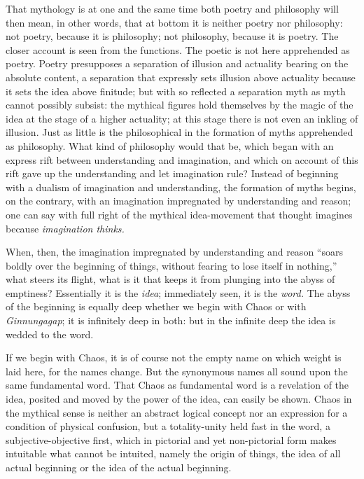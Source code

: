 \documentclass[12pt,a4paper,openany]{book}
\newcommand{\opage}[1]{\marginnote{\footnotesize\textit{[#1]}}}
\begin{document}
That mythology is at one and the same time both poetry and philosophy will then mean, in other words, that at bottom
it is neither poetry nor philosophy: not poetry, because it is philosophy; not philosophy, because it is poetry. The
closer account is seen from the functions. The poetic is not here apprehended as poetry. Poetry presupposes a
separation of illusion and actuality bearing on the absolute content, a separation that expressly sets illusion above
actuality because it sets the idea above finitude; but with so reflected a separation myth as myth cannot possibly
subsist: the mythical figures hold themselves by the magic of the idea at the stage of a higher actuality; at this
stage there is not even an inkling of illusion. Just as little is the philosophical in the formation of myths
apprehended as philosophy. What kind of philosophy would that be, which began with an express rift between
understanding and imagination, and which on account of this rift gave up the understanding and let imagination
\opage{83}rule? Instead of beginning with a dualism of imagination and understanding, the formation of myths begins,
on the contrary, with an imagination impregnated by understanding and reason; one can say with full right of the
mythical idea-movement that thought imagines because \emph{imagination thinks.}

When, then, the imagination impregnated by understanding and reason ``soars boldly over the beginning of things,
without fearing to lose itself in nothing,'' what steers its flight, what is it that keeps it from plunging into the
abyss of emptiness? Essentially it is the \emph{idea}; immediately seen, it is the \emph{word.} The abyss of the
beginning is equally deep whether we begin with Chaos or with \emph{Ginnungagap}; it is infinitely deep in both: but
in the infinite deep the idea is wedded to the word.

If we begin with Chaos, it is of course not the empty name on which weight is laid here, for the names change. But
the synonymous names all sound upon the same fundamental word. That Chaos as fundamental word is a revelation of the
idea, posited and moved by the power of the idea, can easily be shown. Chaos in the mythical sense is neither an
abstract logical concept nor an expression for a condition of physical confusion, but a totality-unity held fast in
the word, a subjective-objective first, which in pictorial and yet non-pictorial form makes intuitable what cannot be
intuited, namely the origin of things, the idea of all actual beginning or the idea of the actual beginning.
\end{document}
